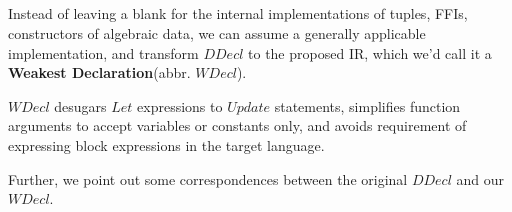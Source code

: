 \documentclass[a1,portrait]{a1poster}
\begin{document}
\begin{multicols}{2}
\begin{multicols}{2}
\vfill\null
\columnbreak

\begin{minipage}[t]{0.8\linewidth}
\begin{bnf*}
    \\
    \\
    \\
    \\
\end{bnf*}
\end{minipage}
\end{multicols}

Instead of leaving a blank for the internal implementations of tuples, FFIs, constructors of algebraic data,
we can assume a generally applicable implementation, and transform $DDecl$ to the proposed IR, which we'd call
it a \textbf{Weakest Declaration}(abbr. $WDecl$).


$WDecl$ desugars $Let$ expressions to $Update$ statements, simplifies function arguments to accept variables or constants only,
and avoids requirement of expressing block expressions in the target language.

Further, we point out some correspondences between the original $DDecl$ and our $WDecl$.

%




\end{multicols}
\end{document}
